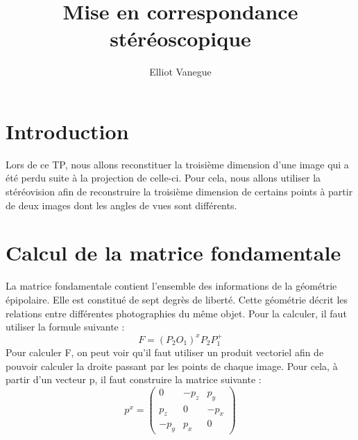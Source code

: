 \documentclass[a4paper,10pt]{article}
\title{Mise en correspondance stéréoscopique}
\author{Elliot Vanegue}
\begin{document}
\maketitle

\section{Introduction}
Lors de ce TP, nous allons reconstituer la troisième dimension d'une image
qui a été perdu suite à la projection de celle-ci. Pour cela, nous allons 
utiliser la stéréovision afin de reconstruire la troisième dimension de certains points à
partir de deux images dont les angles de vues sont différents.

\section{Calcul de la matrice fondamentale}
La matrice fondamentale contient l'ensemble des informations de la géométrie épipolaire.
Elle est constitué de sept degrès de liberté. Cette géométrie décrit les relations entre
différentes photographies du même objet. Pour la calculer, il faut utiliser la formule suivante :
\begin{equation}
 F=(P_2O_1)^xP_2P^+_1
 \label{fondamentale}
\end{equation}
Pour calculer F, on peut voir qu'il faut utiliser un produit vectoriel afin de 
pouvoir calculer la droite passant par les points de chaque image. Pour cela,
à partir d'un vecteur p, il faut construire la matrice suivante :
\begin{equation}
 p^x=\begin{pmatrix}
  0 & -p_z & p_y\\
  p_z & 0 & -p_x\\
  -p_y & p_x & 0
 \end{pmatrix}
 \label{vectoriel}
\end{equation}
\end{document}
